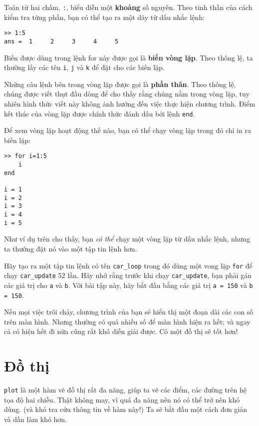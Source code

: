 \documentclass[12pt]{book}
\begin{document}
Toán tử hai chấm, {\tt :}, biểu diễn một {\bf khoảng} số nguyên. Theo
tinh thần của cách kiểm tra từng phần, bạn có thể tạo ra một dãy
từ dấu nhắc lệnh:

\begin{verbatim} 
>> 1:5
ans =  1     2     3     4     5
\end{verbatim}
%
Biến được dùng trong lệnh for này được gọi là {\bf biến vòng lặp}.
Theo thông lệ, ta thường lấy các tên {\tt i}, {\tt j} và {\tt k} để đặt cho
các biến lặp.

Những câu lệnh bên trong vòng lặp được gọi là {\bf phần thân}.  
Theo thông lệ, chúng được viết thụt đầu dòng để cho thấy rằng
chúng nằm trong vòng lặp, tuy nhiên hình thức viết này không ảnh
hưởng đến việc thực hiện chương trình. Điểm kết thúc của vòng
lặp được chính thức đánh dấu bởi lệnh {\tt end}.

Để xem vòng lặp hoạt động thế nào, bạn có thể chạy vòng lặp
trong đó chỉ in ra biến lặp:

\begin{verbatim}
>> for i=1:5
    i
end

i = 1
i = 2
i = 3
i = 4
i = 5
\end{verbatim}
%
Như ví dụ trên cho thấy, bạn {\em có thể} chạy một vòng lặp
từ dấu nhắc lệnh, nhưng ta thường đặt nó vào một tập tin lệnh hơn.

\begin{ex}
Hãy tạo ra một tập tin lệnh có tên \verb#car_loop# trong đó dùng
một vong lặp {\tt for} để chạy \verb#car_update# 52 lần. Hãy nhớ
rằng trước khi chạy \verb#car_update#, bạn phải gán các giá trị
cho {\tt a} và {\tt b}. Với bài tập này, hãy bắt đầu bằng các giá trị  
{\tt a = 150} và {\tt b = 150}.

Nếu mọi việc trôi chảy, chương trình của bạn sẽ hiển thị một 
đoạn dài các con số trên màn hình. Nhưng thường có quá nhiều
số để màn hình hiện ra hết; và ngay cả có hiện hết đi nữa cũng
rất khó diễn giải được. Có một đồ thị sẽ tốt hơn!
\end{ex}


\section{Đồ thị}
\label{plotting}

{\tt plot} là một hàm vẽ đồ thị rất đa năng, giúp ta vẽ các điểm,
các đường trên hệ tọa độ hai chiều. Thật không may, vì quá đa năng
nên nó có thể trở nên khó dùng. (và khó tra cứu thông tin về hàm này!)
Ta sẽ bắt đầu một cách đơn giản và dần làm khó hơn.
\end{document}
